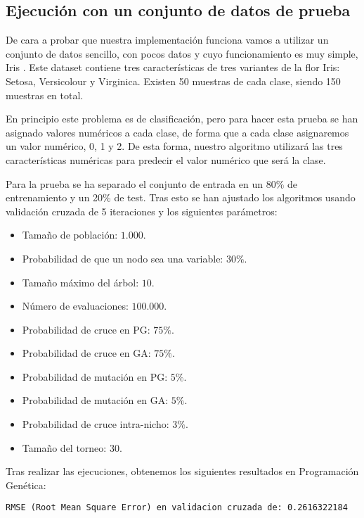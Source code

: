 \newpage

\subsection{Ejecución con un conjunto de datos de prueba}

De cara a probar que nuestra implementación funciona vamos a utilizar un conjunto de datos sencillo, con pocos datos y cuyo funcionamiento es muy simple, Iris \cite{irisDataset}. Este dataset contiene tres características de tres variantes de la flor Iris: Setosa, Versicolour y Virginica. Existen 50 muestras de cada clase, siendo 150 muestras en total.

En principio este problema es de clasificación, pero para hacer esta prueba se han asignado valores numéricos a cada clase, de forma que a cada clase asignaremos un valor numérico, 0, 1 y 2. De esta forma, nuestro algoritmo utilizará las tres características numéricas para predecir el valor numérico que será la clase.


Para la prueba se ha separado el conjunto de entrada en un 80\% de entrenamiento y un 20\% de test. Tras esto se han ajustado los algoritmos usando validación cruzada de 5 iteraciones y los siguientes parámetros:

\begin{itemize}
	\item Tamaño de población: $1.000$.
	\item Probabilidad de que un nodo sea una variable: $30\%$.
	\item Tamaño máximo del árbol: $10$.
	\item Número de evaluaciones: $100.000$.
	\item Probabilidad de cruce en PG: $75\%$.
	\item Probabilidad de cruce en GA: $75\%$.
	\item Probabilidad de mutación en PG: $5\%$.
	\item Probabilidad de mutación en GA: $5\%$.
	\item Probabilidad de cruce intra-nicho: $3\%$.
	\item Tamaño del torneo: $30$.
\end{itemize}

Tras realizar las ejecuciones, obtenemos los siguientes resultados en Programación Genética:

\begin{lstlisting}
RMSE (Root Mean Square Error) en validacion cruzada de: 0.2616322184
\end{lstlisting}

